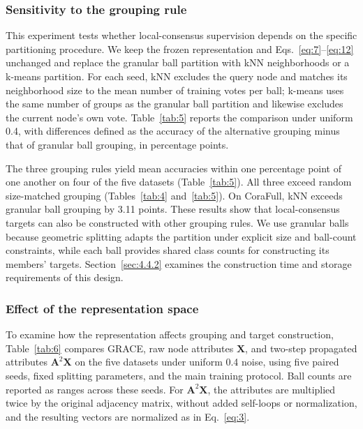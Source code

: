 \documentclass[10pt,letterpaper,nopreprintline]{elsarticle}
\theoremstyle{definition}
\theoremstyle{plain}
\begin{document}
\subsubsection{Sensitivity to the grouping rule}\label{sec:4.3.2}

This experiment tests whether local-consensus supervision depends on the specific partitioning procedure. We keep the frozen representation and Eqs.~\eqref{eq:7}--\eqref{eq:12} unchanged and replace the granular ball partition with kNN neighborhoods or a k-means partition. For each seed, kNN excludes the query node and matches its neighborhood size to the mean number of training votes per ball; k-means uses the same number of groups as the granular ball partition and likewise excludes the current node's own vote. Table~\ref{tab:5} reports the comparison under uniform 0.4, with differences defined as the accuracy of the alternative grouping minus that of granular ball grouping, in percentage points.



The three grouping rules yield mean accuracies within one percentage point of one another on four of the five datasets (Table~\ref{tab:5}). All three exceed random size-matched grouping (Tables~\ref{tab:4} and~\ref{tab:5}). On CoraFull, kNN exceeds granular ball grouping by 3.11 points. These results show that local-consensus targets can also be constructed with other grouping rules. We use granular balls because geometric splitting adapts the partition under explicit size and ball-count constraints, while each ball provides shared class counts for constructing its members' targets. Section~\ref{sec:4.4.2} examines the construction time and storage requirements of this design.

\subsubsection{Effect of the representation space}\label{sec:4.3.3}

To examine how the representation affects grouping and target construction, Table~\ref{tab:6} compares GRACE, raw node attributes \(\mathbf{X}\), and two-step propagated attributes \(\mathbf{A}^2\mathbf{X}\) on the five datasets under uniform 0.4 noise, using five paired seeds, fixed splitting parameters, and the main training protocol. Ball counts are reported as ranges across these seeds. For \(\mathbf{A}^2\mathbf{X}\), the attributes are multiplied twice by the original adjacency matrix, without added self-loops or normalization, and the resulting vectors are normalized as in Eq.~\eqref{eq:3}.
\end{document}
